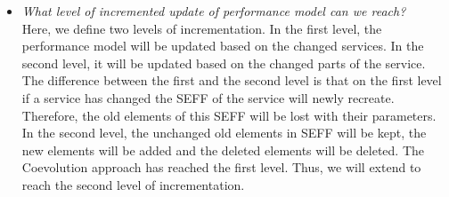 \begin{itemize}
\item \textit{What level of incremented update of performance model can we reach?} \\
Here, we define two levels of incrementation. In the first level, the performance model will be updated based on the changed services. In the second level, it will be updated based on the changed parts of the service. The difference between the first and the second level is that on the first level if a service has changed the SEFF of the service will newly recreate. Therefore, the old elements of this SEFF will be lost with their parameters. In the second level, the unchanged old elements in SEFF will be kept, the new elements will be added and the deleted elements will be deleted. The Coevolution approach has reached the first level. Thus, we will extend to reach the second level of incrementation.


\end{itemize}
